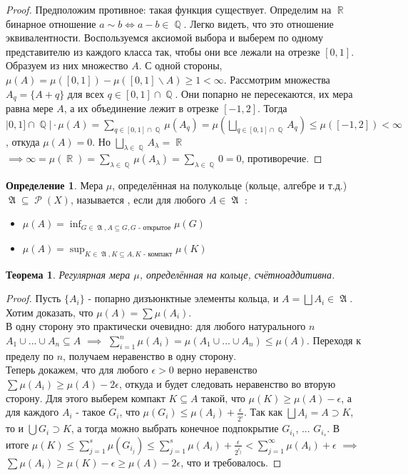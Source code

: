 \documentclass[a4paper]{article}
\theoremstyle{indented}
\newtheorem{theorem}{Теорема}
\theoremstyle{definition}
\newtheorem{defn}{Определение}
\theoremstyle{remark}
\DeclareMathOperator{\QQ}{\mathbb{Q}}
\DeclareMathOperator{\RR}{\mathbb{R}}
\DeclareMathOperator{\GA}{\mathfrak{A}}
\DeclareMathOperator{\Rho}{\mathcal{P}}
\begin{document}
\begin{proof}
Предположим противное: такая функция существует. Определим на $\RR$ бинарное отношение $a \sim b \iff a-b \in \QQ$. Легко видеть, что это отношение эквивалентности. Воспользуемся аксиомой выбора и выберем по одному представителю из каждого класса так, чтобы они все лежали на отрезке $[0, 1]$. Образуем из них множество $A$. С одной стороны, $\mu(A)=\mu([0, 1])-\mu([0, 1] \backslash A) \geq 1 < \infty$. Рассмотрим множества $A_q=\{A+q\}$ для всех $q \in [0, 1] \cap \QQ$. Они попарно не пересекаются, их мера равна мере $A$, а их объединение лежит в отрезке $[-1, 2]$. Тогда $|0, 1] \cap \QQ| \cdot \mu(A) = \sum_{q \in [0, 1] \cap \QQ} \mu(A_q) = \mu(\bigsqcup_{q \in [0, 1] \cap \QQ}A_q) \leq \mu([-1, 2]) < \infty$, откуда $\mu(A)=0$. Но $\bigsqcup_{\lambda \in \QQ} A_{\lambda}=\RR$ $\implies \infty = \mu(\RR)=\sum_{\lambda \in \QQ} \mu(A_{\lambda})=\sum_{\lambda \in \QQ} 0 = 0$, противоречие.
\end{proof}
\begin{defn}
Мера $\mu$, определённая на полукольце (кольце, алгебре и т.д.) $\GA \subseteq \Rho(X)$, называется , если для любого $A \in \GA$ :
\begin{itemize}
    \item $\mu(A)=\inf_{G \in \GA, A \subseteq G, G \text{ - открытое}} \mu(G)$
    \item $\mu(A)=\sup_{K \in \GA, K \subseteq A, K \text{ - компакт}} \mu(K)$
\end{itemize}
\end{defn}
\begin{theorem}
Регулярная мера $\mu$, определённая на кольце, счётноаддитивна.
\end{theorem}
\begin{proof}
Пусть $\{A_i\}$ - попарно дизъюнктные элементы кольца, и $A=\bigsqcup A_i \in \GA$. Хотим доказать, что $\mu(A)=\sum \mu(A_i)$.
\\
В одну сторону это практически очевидно: для любого натурального $n$ $A_1 \cup ... \cup A_n \subseteq A$ $\implies$ $\sum_{i=1}^n \mu(A_i) = \mu(A_1 \cup ... \cup A_n ) \leq \mu(A)$. Переходя к пределу по $n$, получаем неравенство в одну сторону. 
\\
Теперь докажем, что для любого $\epsilon > 0$ верно неравенство $\sum \mu(A_i) \geq \mu(A)-2 \epsilon$, откуда и будет следовать неравенство во вторую сторону. Для этого выберем компакт $K \subseteq A$ такой, что $\mu(K) \geq \mu(A)-\epsilon$, а для каждого $A_i$ - такое $G_i$, что $\mu(G_i) \leq \mu(A_i)+\frac{\epsilon}{2^i}$. Так как $\bigsqcup A_i = A \supset K$, то и $\bigcup G_i \supset K$, а тогда можно выбрать конечное подпокрытие $G_{i_1}$, ... $G_{i_s}$. В итоге $\mu(K) \leq \sum_{j=1}^s \mu(G_{i_j}) \leq \sum_{j=1}^s \mu(A_i)+ \frac{\epsilon}{2^{i_j}} < \sum_{j=1}^{\infty} \mu(A_i) + \epsilon$ $\implies $ $\sum \mu(A_i) \geq \mu(K)-\epsilon \geq \mu(A)-2\epsilon$, что и требовалось.
\end{proof}
\end{document}
